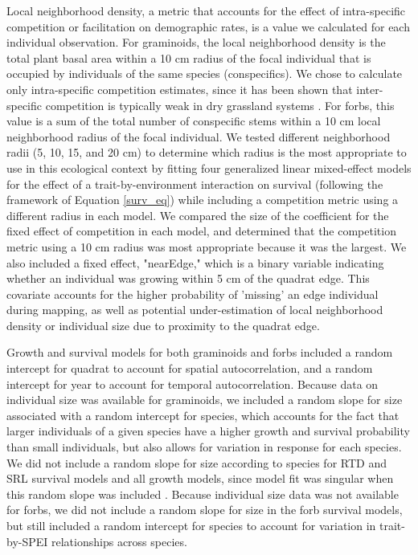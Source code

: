 \documentclass[12pt, letterpaper]{article}
\begin{document}
Local neighborhood density, a metric that accounts for the effect of intra-specific competition or facilitation on demographic rates, is a value we calculated for each individual observation. For graminoids, the local neighborhood density is the total plant basal area within a 10 cm radius of the focal individual that is occupied by individuals of the same species (conspecifics). We chose to calculate only intra-specific competition estimates, since it has been shown that inter-specific competition is typically weak in dry grassland systems \citep{Adler2018}. For forbs, this value is a sum of the total number of conspecific stems within a 10 cm local neighborhood radius of the focal individual. We tested different neighborhood radii (5, 10, 15, and 20 cm) to determine which radius is the most appropriate to use in this ecological context by fitting four generalized linear mixed-effect models for the effect of a trait-by-environment interaction on survival (following the framework of Equation \ref{surv_eq}) while including a competition metric using a different radius in each model. We compared the size of the coefficient for the fixed effect of competition in each model, and determined that the competition metric using a 10 cm radius was most appropriate because it was the largest.  We also included a fixed effect, "nearEdge," which is a binary variable indicating whether an individual was growing within 5 cm of the quadrat edge. This covariate accounts for the higher probability of 'missing' an edge individual during mapping, as well as potential under-estimation of local neighborhood density or individual size due to proximity to the quadrat edge. 

Growth and survival models for both graminoids and forbs included a random intercept for quadrat to account for spatial autocorrelation, and a random intercept for year to account for temporal autocorrelation. Because data on individual size was available for graminoids, we included a random slope for size associated with a random intercept for species, which accounts for the fact that larger individuals of a given species have a higher growth and survival probability than small individuals, but also allows for variation in response for each species. We did not include a random slope for size according to species for RTD and SRL survival models and all growth models, since model fit was singular when this random slope was included \citep{Bates2015}. Because individual size data was not available for forbs, we did not include a random slope for size in the forb survival models, but still included a random intercept for species to account for variation in trait-by-SPEI relationships across species.
\end{document}
